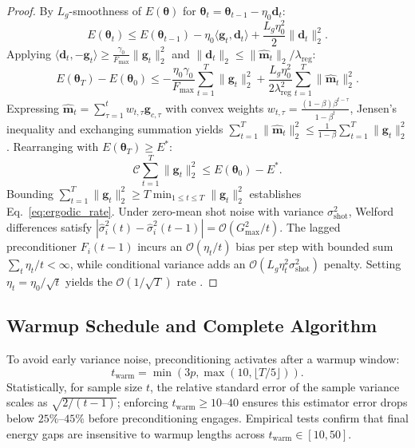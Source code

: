 \documentclass[sn-mathphys,Numbered]{sn-jnl}
\theoremstyle{thmstyleone}
\theoremstyle{thmstyletwo}
\theoremstyle{thmstylethree}
\begin{document}
\begin{proof}
By $L_g$-smoothness of $E(\boldsymbol{\theta})$ for $\boldsymbol{\theta}_t = \boldsymbol{\theta}_{t-1} - \eta_0 \mathbf{d}_t$:
\begin{equation}
E(\boldsymbol{\theta}_t) \le E(\boldsymbol{\theta}_{t-1}) - \eta_0 \langle \mathbf{g}_t, \mathbf{d}_t \rangle + \frac{L_g \eta_0^2}{2} \|\mathbf{d}_t\|_2^2.
\end{equation}
Applying $\langle \mathbf{d}_t, -\mathbf{g}_t \rangle \ge \frac{\gamma_0}{F_{\max}} \|\mathbf{g}_t\|_2^2$ and $\|\mathbf{d}_t\|_2 \le \|\hat{\mathbf{m}}_t\|_2 / \lambda_{\text{reg}}$:
\begin{equation}
E(\boldsymbol{\theta}_T) - E(\boldsymbol{\theta}_0) \le -\frac{\eta_0 \gamma_0}{F_{\max}} \sum_{t=1}^T \|\mathbf{g}_t\|_2^2 + \frac{L_g \eta_0^2}{2 \lambda_{\text{reg}}^2} \sum_{t=1}^T \|\hat{\mathbf{m}}_t\|_2^2.
\end{equation}
Expressing $\hat{\mathbf{m}}_t = \sum_{\tau=1}^t w_{t,\tau} \mathbf{g}_{c,\tau}$ with convex weights $w_{t,\tau} = \frac{(1-\beta)\beta^{t-\tau}}{1-\beta^t}$, Jensen's inequality and exchanging summation yields $\sum_{t=1}^T \|\hat{\mathbf{m}}_t\|_2^2 \le \frac{1}{1-\beta} \sum_{t=1}^T \|\mathbf{g}_t\|_2^2$. Rearranging with $E(\boldsymbol{\theta}_T) \ge E^*$:
\begin{equation}
\mathcal{C} \sum_{t=1}^T \|\mathbf{g}_t\|_2^2 \le E(\boldsymbol{\theta}_0) - E^*.
\end{equation}
Bounding $\sum_{t=1}^T \|\mathbf{g}_t\|_2^2 \ge T \min_{1 \le t \le T} \|\mathbf{g}_t\|_2^2$ establishes Eq.~\eqref{eq:ergodic_rate}. Under zero-mean shot noise with variance $\sigma_{\text{shot}}^2$, Welford differences satisfy $|\hat{\sigma}_i^2(t) - \hat{\sigma}_i^2(t-1)| = \mathcal{O}(G_{\max}^2 / t)$. The lagged preconditioner $F_i(t-1)$ incurs an $\mathcal{O}(\eta_t / t)$ bias per step with bounded sum $\sum_t \eta_t / t < \infty$, while conditional variance adds an $\mathcal{O}(L_g \eta_t^2 \sigma_{\text{shot}}^2)$ penalty. Setting $\eta_t = \eta_0 / \sqrt{t}$ yields the $\mathcal{O}(1/\sqrt{T})$ rate \cite{ghadimi2013stochastic}.
\end{proof}

\subsection{Warmup Schedule and Complete Algorithm}
To avoid early variance noise, preconditioning activates after a warmup window:
\begin{equation}
t_{\text{warm}} = \min(3p, \max(10, \lfloor T / 5 \rfloor)).
\label{eq:warmup}
\end{equation}
Statistically, for sample size $t$, the relative standard error of the sample variance scales as $\sqrt{2/(t-1)}$; enforcing $t_{\text{warm}} \ge 10\text{--}40$ ensures this estimator error drops below $25\%\text{--}45\%$ before preconditioning engages. Empirical tests confirm that final energy gaps are insensitive to warmup lengths across $t_{\text{warm}} \in [10, 50]$.
\end{document}
